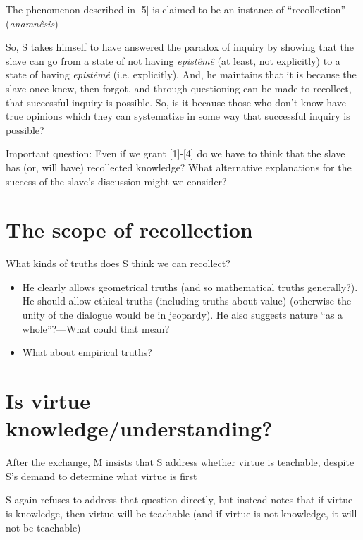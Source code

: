 \documentclass[11pt]{article}
\begin{document}
\noindent [6] The phenomenon described in [5] is claimed to be an instance of ``recollection'' (\emph{anamn\^{e}sis})
\vspace*{2mm}

\noindent So, S takes himself to have answered the paradox of inquiry by showing that the slave can go from a state of not having \emph{epist\^{e}m\^{e}} (at least, not explicitly) to a state of having \emph{epist\^{e}m\^{e}} (i.e. explicitly). And, he maintains that it is because the slave once knew, then forgot, and through questioning can be made to recollect, that successful inquiry is possible. So, is it because those who don't know have true opinions which they can systematize in some way that successful inquiry is possible?
\vspace*{2mm}

\noindent Important question: Even if we grant [1]-[4] do we have to think that the slave has (or, will have) recollected knowledge? What alternative explanations for the success of the slave's discussion might we consider?

\section*{The scope of recollection}

\noindent What kinds of truths does S think we can recollect?

\begin{itemize}\item{He clearly allows geometrical truths (and so mathematical truths generally?). He should allow ethical truths (including truths about value) (otherwise the unity of the dialogue would be in jeopardy). He also suggests nature ``as a whole''?---What could that mean?}\item{What about empirical truths?}\end{itemize}

\section*{Is virtue knowledge/understanding?}

\noindent After the exchange, M insists that S address whether virtue is teachable, despite S's demand to determine what virtue is first
\vspace*{2mm}

\noindent S again refuses to address that question directly, but instead notes that if virtue is knowledge, then virtue will be teachable (and if virtue is not knowledge, it will not be teachable)
\vspace*{2mm}
\end{document}
